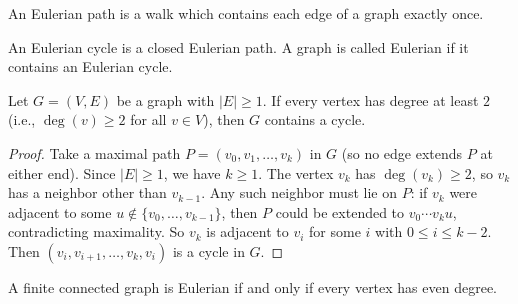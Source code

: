 \documentclass[11pt, a4paper]{ctexrep}
\begin{document}
\begin{topic}
\begin{center}
    \end{center}
\end{topic}

\begin{definition}
    An Eulerian path is a walk which contains each edge of a graph exactly once.
\end{definition}

\begin{definition}
    An Eulerian cycle is a closed Eulerian path. A graph is called Eulerian if it contains an Eulerian cycle.
\end{definition}

\begin{lemma}
    Let $G = (V,E)$ be a graph with $|E| \ge 1$. If every vertex has degree at least $2$ (i.e., $\deg(v) \ge 2$ for all $v \in V$), then $G$ contains a cycle.
\end{lemma}

\begin{proof}
    Take a maximal path $P = (v_0, v_1, \ldots, v_k)$ in $G$ (so no edge extends $P$ at either end). Since $|E| \ge 1$, we have $k \ge 1$. The vertex $v_k$ has $\deg(v_k) \ge 2$, so $v_k$ has a neighbor other than $v_{k-1}$. Any such neighbor must lie on $P$: if $v_k$ were adjacent to some $u \notin \{v_0,\ldots,v_{k-1}\}$, then $P$ could be extended to $v_0 \cdots v_k u$, contradicting maximality. So $v_k$ is adjacent to $v_i$ for some $i$ with $0 \le i \le k-2$. Then $(v_i, v_{i+1}, \ldots, v_k, v_i)$ is a cycle in $G$.
\end{proof}

\begin{theorem}
    A finite connected graph is Eulerian if and only if every vertex has even degree.
\end{theorem}
\end{document}
